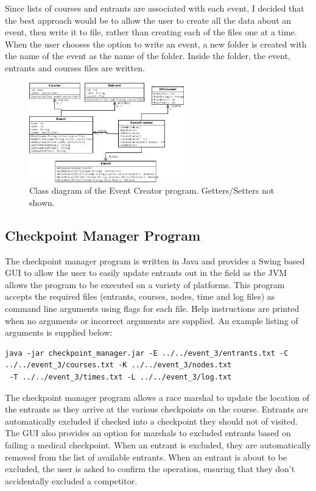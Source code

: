 \documentclass{article}
\begin{document}
Since lists of courses and entrants are associated with each event, I decided that the best approach would be to allow the user to create all the data about an event, then write it to file, rather than creating each of the files one at a time. When the user chooses the option to write an event, a new folder is created with the name of the event as the name of the folder. Inside the folder, the event, entrants and courses files are written.


\begin{figure}[H]
\centering
\includegraphics[width=0.6\textwidth]{diagrams/event_creator.png}
\caption{Class diagram of the Event Creator program. Getters/Setters not shown.}
\label{fig:GUI-image}
\end{figure}

\subsection{Checkpoint Manager Program}
The checkpoint manager program is written in Java and provides a Swing based GUI to allow the user to easily update entrants out in the field as the JVM allows the program to be executed on a variety of platforms. This program accepts the required files (entrants, courses, nodes, time and log files) as command line arguments using flags for each file. Help instructions are printed when no arguments or incorrect arguments are supplied. An example listing of arguments is supplied below:

\begin{center}
	\begin{lstlisting}[showstringspaces=false]
java -jar checkpoint_manager.jar -E ../../event_3/entrants.txt -C ../../event_3/courses.txt -K ../../event_3/nodes.txt
 -T ../../event_3/times.txt -L ../../event_3/log.txt

	\end{lstlisting}
\end{center}

The checkpoint manager program allows a race marshal to update the location of the entrants as they arrive at the various checkpoints on the course. Entrants are automatically excluded if checked into a checkpoint they should not of visited. The GUI also provides an option for marshals to excluded entrants based on failing a medical checkpoint. When an entrant is excluded, they are automatically removed from the list of available entrants. When an entrant is about to be excluded, the user is asked to confirm the operation, ensuring that they don't accidentally excluded a competitor.
\end{document}
